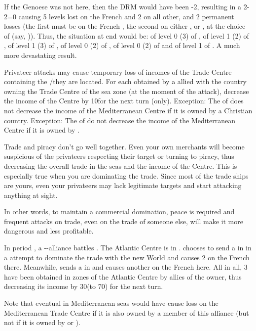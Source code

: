 \begin{exemple}
  \smallskip

  If the Genoese \FLEET was not here, then the DRM would have been -2,
  resulting in a 2-2=0 causing 5 levels lost on the French \TradeFLEET and 2
  on all other, and 2 permanent losses (the first must be on the French
  \TradeFLEET, the second on either \FRA, \paysGenes or \paysHollande, at the
  choice of \TUR (say, \paysGenes)). Thus, the situation at end would be:
  \TradeFLEET\facemoins of level 0 (3) of \FRA, \TradeFLEET\facemoins of level
  1 (2) of \paysGenes, \TradeFLEET\facemoins of level 1 (3) of \paysHollande,
  \TradeFLEET\facemoins of level 0 (2) of \HIS, \TradeFLEET\facemoins of level
  0 (2) of \VEN and \TradeFLEET\facemoins of level 1 of \TUR. A much more
  devastating result.
\end{exemple}

\bparag Privateer attacks may cause temporary loss of incomes of the Trade
Centre containing the \STZ/\CTZ they are located.
\bparag For each \textetoile obtained by a \corsaire allied with the country
owning the Trade Centre of the sea zone (at the moment of the attack),
decrease the income of the Centre by 10\ducats for the next turn (only).
\bparag Exception: The \corsaire of  does not decrease the
income of the Mediterranean Centre if it is owned by a Christian country.
\bparag Exception: The \corsaire of \Barbaresques do not decrease the income
of the Mediterranean Centre if it is owned by \TUR.

\begin{designnote}
  Trade and piracy don't go well together. Even your own merchants will become
  suspicious of the privateers respecting their target or turning to piracy,
  thus decreasing the overall trade in the seas and the income of the
  Centre. This is especially true when you are dominating the trade. Since
  most of the trade ships are yours, even your privateers may lack legitimate
  targets and start attacking anything at sight.

  In other words, to maintain a commercial domination, peace is required and
  frequent attacks on trade, even on the trade of someone else, will make it
  more dangerous and less profitable.
\end{designnote}

\begin{exemple}
  In period , a \HOL-\ANG-\SPA alliance battles \FRA. The Atlantic
  Centre is in \HOL. \ANG chooses to send a \corsaire in  in a
  attempt to dominate the trade with the new World and causes 2 \textetoile on
  the French \TradeFLEET there. Meanwhile, \SPA sends a \corsaire in
   and causes another \textetoile on the French \TradeFLEET
  here. All in all, 3 \textetoile have been obtained in zones of the Atlantic
  Centre by allies of the owner, thus decreasing its income by 30\ducats (to
  70\ducats) for the next turn.

  Note that eventual \textetoile in Mediterranean seas would have cause loss
  on the Mediterranean Trade Centre if it is also owned by a member of this
  alliance (but not if it is owned by \FRA or \TUR).
\end{exemple}

